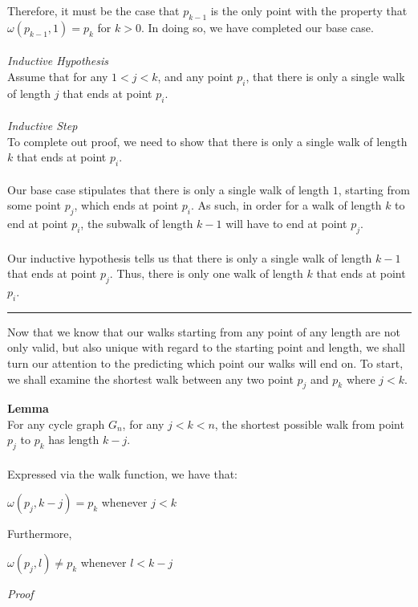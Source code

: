 \documentclass[a4paper,12pt]{article}
\begin{document}
Therefore, it must be the case that $p_{k-1}$ is the only point with the property that $\omega(p_{k-1}, 1) = p_k$ for $k > 0$. In doing so, we have completed our base case.\\
\\
\textit{Inductive Hypothesis}\\
Assume that for any $1 < j < k$, and any point $p_i$, that there is only a single walk of length $j$ that ends at point $p_i$.\\
\\
\textit{Inductive Step}\\
To complete out proof, we need to show that there is only a single walk of length $k$ that ends at point $p_i$.\\
\\
Our base case stipulates that there is only a single walk of length $1$, starting from some point $p_j$, which ends at point $p_i$. As such, in order for a walk of length $k$ to end at point $p_i$, the subwalk of length $k - 1$ will have to end at point $p_j$.\\
\\
Our inductive hypothesis tells us that there is only a single walk of length $k - 1$ that ends at point $p_j$. Thus, there is only one walk of length $k$ that ends at point $p_i$.
\begin{center}
\noindent\rule{8cm}{0.4pt}
\end{center} 
\noindent
Now that we know that our walks starting from any point of any length are not only valid, but also unique with regard to the starting point and length, we shall turn our attention to the predicting which point our walks will end on. To start, we shall examine the shortest walk between any two point $p_j$ and $p_k$ where $j < k$.\\
\begin{tcolorbox}
\textbf{Lemma}\\
For any cycle graph $G_n$, for any $j < k < n$, the shortest possible walk from point $p_j$ to $p_k$ has length $k - j$.\\
\\
Expressed via the walk function, we have that:
\begin{center}
$\omega(p_j, k - j) = p_k$ whenever $j < k$
\end{center}
Furthermore,
\begin{center}
$\omega(p_j, l) \neq p_k$ whenever $l < k - j$
\end{center}
\end{tcolorbox}
\noindent
\textit{Proof}\\
\end{document}
